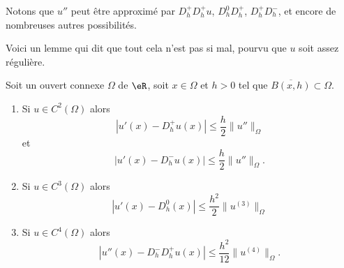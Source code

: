 Notons que \( u''\) peut être approximé par \( D_h^+D_h^+u\), \( D_h^0D_h^+\), \( D_h^+D_h^-\), et encore de nombreuses autres possibilités.

Voici un lemme qui dit que tout cela n'est pas si mal, pourvu que \( u\) soit assez régulière.

\begin{lemma}       \label{LEMooZECZooVKxOZZ}
	Soit un ouvert connexe \( \Omega\) de \( \eR\), soit \( x\in \Omega\) et \( h>0\) tel que \( \overline{ B(x,h) }\subset \Omega\).
	\begin{enumerate}
		\item
		      Si \( u\in C^2( \Omega )\) alors
		      \begin{equation}
			      | u'(x)-D_h^+u(x) |\leq \frac{ h }{2}\| u'' \|_{\Omega}
		      \end{equation}
		      et
		      \begin{equation}
			      | u'(x)-D_h^-u(x) |\leq \frac{ h }{2}\| u'' \|_{\Omega}.
		      \end{equation}
		\item       \label{ITEMooSAWJooJUTWAb}
		      Si \( u\in C^3(\Omega)\) alors
		      \begin{equation}
			      | u'(x)-D_h^0(x) |\leq \frac{ h^2 }{2}\| u^{(3)} \|_{\Omega}
		      \end{equation}
		\item       \label{ITEMooRWUHooZJLKuL}
		      Si \( u\in C^4(\Omega)\) alors
		      \begin{equation}
			      | u''(x)-D_h^-D_h^+u(x) |\leq \frac{ h^2 }{ 12 }\| u^{(4)} \|_{\Omega}.
		      \end{equation}
	\end{enumerate}
\end{lemma}

